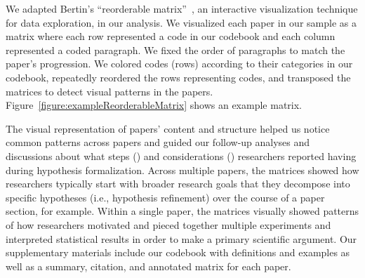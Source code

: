 \figureExampleReorderableMatrix

We adapted Bertin's ``reorderable matrix''~\cite{bertin2011graphics}, an
interactive visualization technique for data exploration, in our analysis. We
visualized each paper in our sample as a matrix where each row represented a
code in our codebook and each column represented a coded paragraph. We fixed the
order of paragraphs to match the paper's progression. We colored codes (rows)
according to their categories in our codebook, repeatedly reordered the rows
representing codes, and transposed the matrices to detect visual patterns in the
papers. Figure~\ref{figure:exampleReorderableMatrix} shows an example matrix. 

The visual representation of papers' content and structure helped us notice
common patterns across papers and guided our follow-up analyses and discussions about what steps
(\rqSteps) and considerations (\rqProcess) researchers reported having during
hypothesis formalization. Across multiple papers, the matrices showed how
researchers typically start with broader research goals that they decompose into
specific hypotheses (i.e., hypothesis refinement) over the course of a paper
section, for example. Within a single paper, the matrices visually showed patterns of how
researchers motivated and pieced together multiple experiments and interpreted
statistical results in order to make a primary scientific argument. Our
supplementary materials include our codebook with definitions and examples as
well as a summary, citation, and annotated matrix for each paper.



